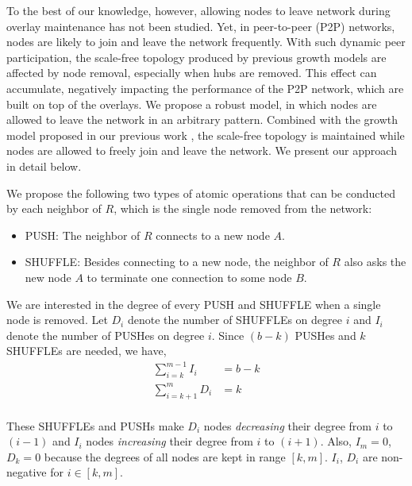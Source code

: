 To the best of our knowledge, however, allowing nodes to leave network during overlay maintenance has not been studied. Yet, in peer-to-peer (P2P) networks, nodes are likely to join and leave the network frequently. With such dynamic peer participation, the scale-free topology produced by previous growth models are affected by node removal, especially when hubs are removed. This effect can accumulate, negatively impacting the performance of the P2P network, which are built on top of the overlays. We propose a robust model, in which nodes are allowed to leave the network in an arbitrary pattern. Combined with the growth model proposed in our previous work \cite{bulut2014constructing}, the scale-free topology is maintained while nodes are allowed to freely join and leave the network. We present our approach in detail below.

We propose the following two types of atomic operations that can be conducted by each neighbor of $R$, which is the single node removed from the network:
\begin{itemize}
    \item PUSH: The neighbor of $R$ connects to a new node $A$.
    \item SHUFFLE: Besides connecting to a new node, the neighbor of $R$ also asks the new node $A$ to terminate one connection to some node $B$.
\end{itemize}

We are interested in the degree of every PUSH and SHUFFLE when a single node is removed. Let $D_i$ denote the number of SHUFFLEs on degree $i$ and $I_i$ denote the number of PUSHes on degree $i$. Since $(b-k)$ PUSHes and $k$ SHUFFLEs are needed, we have,
\begin{equation}\label{eq:sumIsumD}
   \begin{array}{rl}
 \sum_{i=k}^{m-1} I_i & = b-k \\
 \sum_{i=k+1}^{m} D_i &= k\\
\end{array} 
\end{equation}

These SHUFFLEs and PUSHs make $D_i$ nodes \textit{decreasing} their degree from $i$ to $(i-1)$ and $I_i$ nodes \textit{increasing} their degree from $i$ to $(i+1)$. Also, $I_m = 0$, $D_k = 0$ because the degrees of all nodes are kept in range $[k, m]$. $I_i$, $D_i$ are non-negative for $i\in[k,m]$.

